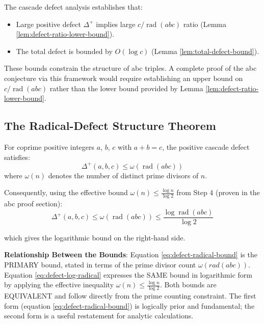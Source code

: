 \begin{remark}
\label{rem:bound-direction}
The cascade defect analysis establishes that:
\begin{itemize}
\item Large positive defect $\Delta^{+}$ implies large $c/\operatorname{rad}(abc)$ ratio (Lemma \ref{lem:defect-ratio-lower-bound}).
\item The total defect is bounded by $O(\log c)$ (Lemma \ref{lem:total-defect-bound}).
\end{itemize}

These bounds constrain the structure of abc triples. A complete proof of the abc conjecture via this framework would require establishing an upper bound on $c/\operatorname{rad}(abc)$ rather than the lower bound provided by Lemma \ref{lem:defect-ratio-lower-bound}.
\end{remark}

\subsection{The Radical-Defect Structure Theorem}
\label{subsec:radical-defect-structure}

\begin{theorem}
\label{thm:radical-controlled-defect}
For coprime positive integers $a$, $b$, $c$ with $a + b = c$, the positive cascade defect satisfies:
\begin{equation}
\label{eq:defect-radical-bound}
\Delta^{+}(a,b,c) \leq \omega(\operatorname{rad}(abc))
\end{equation}
where $\omega(n)$ denotes the number of distinct prime divisors of $n$.

Consequently, using the effective bound $\omega(n) \leq \frac{\log n}{\log 2}$ from Step 4 (proven in the abc proof section):
\begin{equation}
\label{eq:defect-log-radical}
\Delta^{+}(a,b,c) \leq \omega(\operatorname{rad}(abc)) \leq \frac{\log \operatorname{rad}(abc)}{\log 2}
\end{equation}

which gives the logarithmic bound on the right-hand side.

\noindent \textbf{Relationship Between the Bounds}: Equation \eqref{eq:defect-radical-bound} is the PRIMARY bound, stated in terms of the prime divisor count $\omega(rad(abc))$. Equation \eqref{eq:defect-log-radical} expresses the SAME bound in logarithmic form by applying the effective inequality $\omega(n) \leq \frac{\log n}{\log 2}$. Both bounds are EQUIVALENT and follow directly from the prime counting constraint. The first form (equation \eqref{eq:defect-radical-bound}) is logically prior and fundamental; the second form is a useful restatement for analytic calculations.

\end{theorem}

